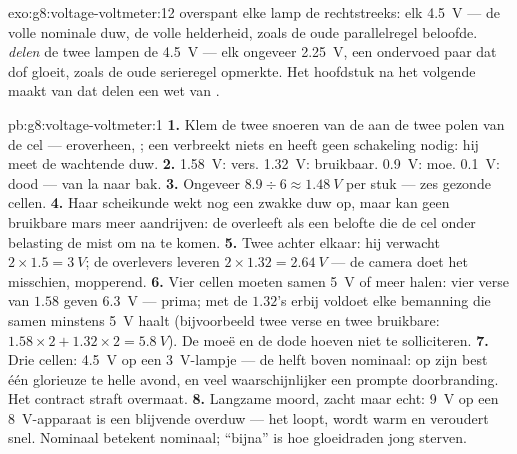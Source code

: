 \begin{solution}{exo:g8:voltage-voltmeter:12}
 overspant elke lamp de 
rechtstreeks: elk \qty{4.5}{V} --- de volle nominale duw, de volle
helderheid, zoals de oude parallelregel beloofde. 
\emph{delen} de twee lampen de \qty{4.5}{V} --- elk ongeveer
\qty{2.25}{V}, een ondervoed paar dat dof gloeit, zoals de oude
serieregel opmerkte. Het hoofdstuk na het volgende maakt van dat delen
een wet van .
\end{solution}

\begin{solution}{pb:g8:voltage-voltmeter:1}
\textbf{1.} Klem de twee snoeren van de  aan de twee
polen van de cel --- eroverheen, ; een
 verbreekt niets en heeft geen schakeling nodig: hij
meet de wachtende duw.
\textbf{2.} \qty{1.58}{V}: vers. \qty{1.32}{V}: bruikbaar.
\qty{0.9}{V}: moe. \qty{0.1}{V}: dood --- van la naar bak.
\textbf{3.} Ongeveer $8.9 \div 6 \approx \qty{1.48}{V}$ per stuk ---
zes gezonde cellen.
\textbf{4.} Haar scheikunde wekt nog een zwakke duw op, maar kan geen
bruikbare mars meer aandrijven: de  overleeft als een
belofte die de cel onder belasting de  mist om na te komen.
\textbf{5.} Twee achter elkaar: hij verwacht $2 \times 1.5 =
\qty{3}{V}$; de overlevers leveren $2 \times 1.32 = \qty{2.64}{V}$ ---
de camera doet het misschien, mopperend.
\textbf{6.} Vier cellen moeten samen \qty{5}{V} of meer halen: vier
verse van $1.58$ geven \qty{6.3}{V} --- prima; met de $1.32$'s erbij
voldoet elke bemanning die samen minstens \qty{5}{V} haalt (bijvoorbeeld
twee verse en twee bruikbare: $1.58 \times 2 + 1.32 \times 2 =
\qty{5.8}{V}$). De moeë en de dode hoeven niet te solliciteren.
\textbf{7.} Drie cellen: \qty{4.5}{V} op een
\qty{3}{V}-lampje --- de helft boven nominaal: op zijn best één
glorieuze te helle avond, en veel waarschijnlijker een prompte
doorbranding. Het contract straft overmaat.
\textbf{8.} Langzame moord, zacht maar echt: \qty{9}{V} op een
\qty{8}{V}-apparaat is een blijvende overduw --- het loopt, wordt warm
en veroudert snel. Nominaal betekent nominaal; ``bijna'' is hoe
gloeidraden jong sterven.

\end{solution}
